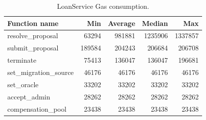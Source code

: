 \begin{table}[H]
	\centering
	\caption{LoanService Gas consumption.}
	\label{tab:loanservice_gas}
	\begin{tabular}{lrrrr}
		\toprule
		\textbf{Function name} & \textbf{Min} & \textbf{Average} & \textbf{Median} & \textbf{Max} \\
		\midrule
		resolve\_proposal     & 63294  & 981881  & 1235906 & 1337857 \\
		submit\_proposal      & 189584 & 204243  & 206684  & 206708  \\
		terminate             & 75413  & 136047  & 136047  & 196681  \\
		set\_migration\_source& 46176  & 46176   & 46176   & 46176   \\
		set\_oracle           & 33202  & 33202   & 33202   & 33202   \\
		accept\_admin         & 28262  & 28262   & 28262   & 28262   \\
		compensation\_pool    & 23438  & 23438   & 23438   & 23438   \\
		\bottomrule
	\end{tabular}
\end{table}

